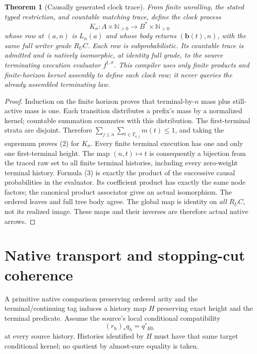 \documentclass[11pt]{article}
\newtheorem{theorem}{Theorem}\newtheorem{proposition}[theorem]{Proposition}
\begin{document}
\begin{theorem}[Causally generated clock trace]
From finite unrolling, the stated typed restriction, and countable matching trace, define the clock process
\[
 K_\sigma:A\times\mathbb N_{>0}\longrightarrow B^*\times\mathbb N_{>0}
\]
whose row at $(a,n)$ is $L_n(a)$ and whose body returns $(\mathbf b(t),n)$, with the same full writer grade $R_UC$. Each row is subprobabilistic. Its countable trace is admitted and is natively isomorphic, at identity full grade, to the source terminating execution evaluator $f^{\dagger,\sigma}$. This compiler uses only finite products and finite-horizon kernel assembly to define each clock row; it never queries the already assembled terminating law.
\end{theorem}
\begin{proof}
Induction on the finite horizon proves that terminal-by-$n$ mass plus still-active mass is one. Each transition distributes a prefix's mass by a normalized kernel; countable summation commutes with this distribution. The first-terminal strata are disjoint. Therefore $\sum_{j\leq n}\sum_{t\in T_{a,j}}m(t)\leq1$, and taking the supremum proves (2) for $K_\sigma$. Every finite terminal execution has one and only one first-terminal height. The map $(n,t)\mapsto t$ is consequently a bijection from the traced raw set to all finite terminal histories, including every zero-weight terminal history. Formula (3) is exactly the product of the successive causal probabilities in the evaluator. Its coefficient product has exactly the same node factors; the canonical product associator gives an actual isomorphism. The ordered leaves and full tree body agree. The global map is identity on \emph{all} $R_UC$, not its realized image. These maps and their inverses are therefore actual native arrows.
\end{proof}

\section{Native transport and stopping-cut coherence}
A primitive native comparison preserving ordered arity and the terminal/continuing tag induces a history map $H$ preserving exact height and the terminal predicate. Assume the source's local conditional compatibility
\[
 (r_h)_*q_h=q'_{Hh}                                       \tag{4}
\]
at every source history. Histories identified by $H$ must have that same target conditional kernel; no quotient by almost-sure equality is taken.
\end{document}
